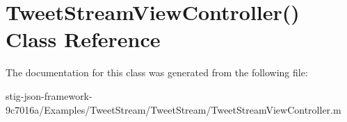 \hypertarget{interface_tweet_stream_view_controller_07_08}{
\section{\-Tweet\-Stream\-View\-Controller() \-Class \-Reference}
\label{interface_tweet_stream_view_controller_07_08}
}


\-The documentation for this class was generated from the following file\-:\begin{DoxyCompactItemize}
\item 
stig-\/json-\/framework-\/9c7016a/\-Examples/\-Tweet\-Stream/\-Tweet\-Stream/\-Tweet\-Stream\-View\-Controller.\-m\end{DoxyCompactItemize}
